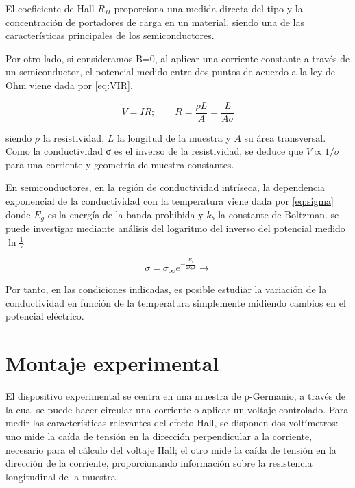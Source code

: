 	\vspace{\baselineskip}
		
	El coeficiente de Hall $R_H$ proporciona una medida directa del tipo y la concentración de portadores de carga en un material, siendo una de las características principales de los semiconductores.		

	\clearpage
	
	
	Por otro lado, si consideramos B=0, al aplicar una corriente constante a través de un semiconductor, el potencial medido entre dos puntos de acuerdo a la ley de Ohm viene dada por \ref{eq:VIR}.
	
	\begin{equation} \label{eq:VIR}
		V = IR; \qquad R = \frac{\rho L}{A} = \frac{L}{A\sigma} 
	\end{equation}
	
 	siendo $\rho$ la resistividad, $L$ la longitud de la muestra y $A$ su área transversal. Como la conductividad σ es el inverso de la resistividad, se deduce que $V \propto 1/\sigma$ para una corriente y geometría de muestra constantes. 
 	
 	\vspace{\baselineskip}
 	
 	En semiconductores, en la región de conductividad intríseca, la dependencia exponencial de la conductividad con la temperatura viene dada por \ref{eq:sigma}  donde $E_g$ es la energía de la banda prohibida y $k_b$ la constante de Boltzman. se puede investigar mediante análisis del logaritmo del inverso del potencial medido $\ln \frac{1}{V}$ 
 	
 	\begin{equation} \label{eq:sigma}
 		\sigma =  \sigma_{\infty} e^{-\textstyle \frac{E_g}{2k_bT}} \rightarrow 
 	\end{equation}
 
	Por tanto, en las condiciones indicadas, es posible  estudiar la variación de la conductividad en función de la temperatura simplemente midiendo cambios en el potencial eléctrico. 
	
	\section{Montaje experimental}
	
	
	El dispositivo experimental se centra en una muestra de p-Germanio, a través de la cual se puede hacer circular una corriente o aplicar un voltaje controlado. Para medir las características relevantes del efecto Hall, se disponen dos voltímetros: uno mide la caída de tensión en la dirección perpendicular a la corriente, necesario para el cálculo del voltaje Hall; el otro mide la caída de tensión en la dirección de la corriente, proporcionando información sobre la resistencia longitudinal de la muestra.
	
